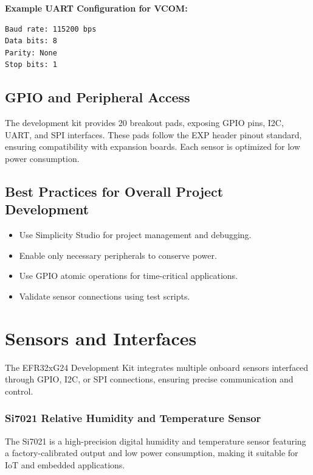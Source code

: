 \documentclass[
  9pt,
  letterpaper,
  abstract,
  titlepage]{scrbook}
\begin{document}
\textbf{Example UART Configuration for VCOM:}

\begin{verbatim}
Baud rate: 115200 bps
Data bits: 8
Parity: None
Stop bits: 1
\end{verbatim}

\subsection{GPIO and Peripheral
Access}\label{gpio-and-peripheral-access}

The development kit provides 20 breakout pads, exposing GPIO pins, I2C,
UART, and SPI interfaces. These pads follow the EXP header pinout
standard, ensuring compatibility with expansion boards. Each sensor is
optimized for low power consumption.

\subsection{Best Practices for Overall Project
Development}\label{best-practices-for-overall-project-development}

\begin{itemize}
\item
  Use Simplicity Studio for project management and debugging.
\item
  Enable only necessary peripherals to conserve power.
\item
  Use GPIO atomic operations for time-critical applications.
\item
  Validate sensor connections using test scripts.
\end{itemize}

\section{Sensors and Interfaces}\label{sensors-and-interfaces}

The EFR32xG24 Development Kit integrates multiple onboard sensors
interfaced through GPIO, I2C, or SPI connections, ensuring precise
communication and control.

\subsubsection{Si7021 Relative Humidity and Temperature
Sensor}\label{si7021-relative-humidity-and-temperature-sensor}

The Si7021 is a high-precision digital humidity and temperature sensor
featuring a factory-calibrated output and low power consumption, making
it suitable for IoT and embedded applications.
\end{document}
